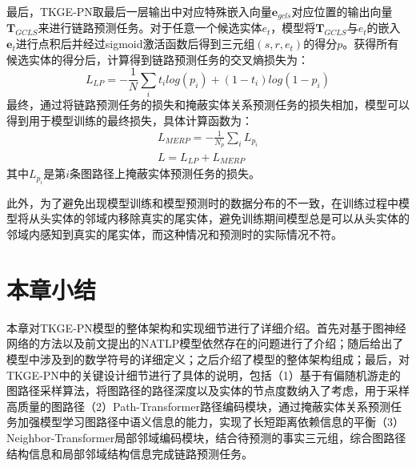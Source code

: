 最后，TKGE-PN取最后一层输出中对应特殊嵌入向量$\boldsymbol{e}_{gcls}$对应位置的输出向量$\boldsymbol{T}_{GCLS}$来进行链路预测任务。对于任意一个候选实体$e_t$，模型将$\boldsymbol{T}_{GCLS}$与$e_t$的嵌入$\boldsymbol{e}_{t}$进行点积后并经过sigmoid激活函数后得到三元组$(s,r,e_t)$的得分$p$。获得所有候选实体的得分后，计算得到链路预测任务的交叉熵损失为：
\begin{equation}
  L_{LP} = -\frac{1}{N}\sum\limits_{i}t_ilog(p_i)+(1-t_i)log(1-p_i)
\end{equation}
最终，通过将链路预测任务的损失和掩蔽实体关系预测任务的损失相加，模型可以得到用于模型训练的最终损失，具体计算函数为：
\begin{gather}
  L_{MERP} = -\frac{1}{N_p}\sum\limits_{i}L_{p_{i}}\\
  L=L_{LP}+L_{MERP}
\end{gather}
其中$L_{p_{i}}$是第$i$条图路径上掩蔽实体预测任务的损失。

此外，为了避免出现模型训练和模型预测时的数据分布的不一致，在训练过程中模型将从头实体的邻域内移除真实的尾实体，避免训练期间模型总是可以从头实体的邻域内感知到真实的尾实体，而这种情况和预测时的实际情况不符。


\section{本章小结}

本章对TKGE-PN模型的整体架构和实现细节进行了详细介绍。首先对基于图神经网络的方法以及前文提出的NATLP模型依然存在的问题进行了介绍；随后给出了模型中涉及到的数学符号的详细定义；之后介绍了模型的整体架构组成；最后，对TKGE-PN中的关键设计细节进行了具体的说明，包括（1）基于有偏随机游走的图路径采样算法，将图路径的路径深度以及实体的节点度数纳入了考虑，用于采样高质量的图路径（2）Path-Transformer路径编码模块，通过掩蔽实体关系预测任务加强模型学习图路径中语义信息的能力，实现了长短距离依赖信息的平衡（3）Neighbor-Transformer局部邻域编码模块，结合待预测的事实三元组，综合图路径结构信息和局部邻域结构信息完成链路预测任务。
